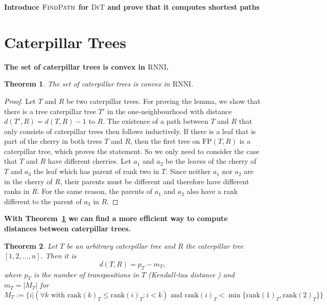 \documentclass[11pt]{amsart}
\newtheorem{theorem}{Theorem}
\newcommand{\tocite}{ {\color{red}\fbox{CITATION}} }
\newcommand{\rnni}{\mathrm{RNNI}}
\newcommand{\findpath}{\textsc{FindPath}}
\newcommand{\rank}{\mathrm{rank}}
\newcommand{\fp}{\mathrm{FP}}
\newcommand{\dtt}{\mathrm{DtT}}
\newcommand{\summary}[1]{\textbf{#1}} %
\begin{document}
\summary{Introduce $\findpath$ for $\dtt$ and prove that it computes shortest paths}

\section{Caterpillar Trees}

\summary{The set of caterpillar trees is convex in $\rnni$.}
\begin{theorem}
	The set of caterpillar trees is convex in $\rnni$.
	\label{thm:caterpillar_convex_rnni}
\end{theorem}

\begin{proof}
	Let $T$ and $R$ be two caterpillar trees.
	For proving the lemma, we show that there is a tree caterpillar tree $T'$ in the one-neighbourhood with distance $d(T',R) = d(T,R) - 1$ to $R$.
	The existence of a path between $T$ and $R$ that only consists of caterpillar trees then follows inductively.
	If there is a leaf that is part of the cherry in both trees $T$ and $R$, then the first tree on $\fp(T,R)$ is a caterpillar tree, which proves the statement.
	So we only need to consider the case that $T$ and $R$ have different cherries.
	Let $a_1$ and $a_2$ be the leaves of the cherry of $T$ and $a_3$ the leaf which has parent of rank two in $T$.
	Since neither $a_1$ nor $a_2$ are in the cherry of $R$, their parents must be different and therefore have different ranks in $R$.
	For the same reason, the parents of $a_1$ and $a_2$ also have a rank different to the parent of $a_3$ in $R$.
\end{proof}


\summary{With Theorem~\ref{thm:caterpillar_convex_rnni} we can find a more efficient way to compute distances between caterpillar trees.}

\begin{theorem}
	Let $T$ be an arbitrary caterpillar tree and $R$ the caterpillar tree $[1,2, \ldots, n]$.
	Then it is
	\[d(T,R) = p_T - m_T,\]
	where $p_T$ is the number of transpositions in $T$ (Kendall-tau distance \tocite) and $m_T = |M_T|$ for
	\[{M_T} := \{i| (\forall k \text{ with } \rank(k)_T \leq \rank(i)_T: i < k) \text{ and } \rank(i)_T < \min\{\rank(1)_T, \rank(2)_T\}\}\]
	\label{thm:caterpillar_distance_formula}
\end{theorem}
\end{document}
